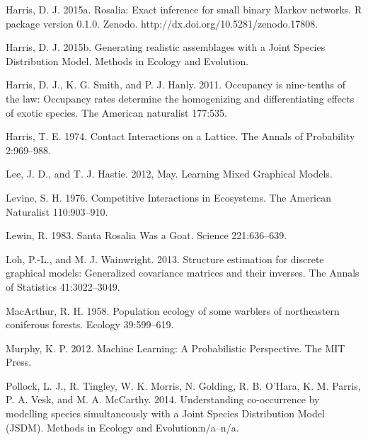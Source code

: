 \documentclass[12pt,]{article}
\begin{document}
\begin{spacing}{1.9}
\begin{flushleft}
Harris, D. J. 2015a. Rosalia: Exact inference for small binary Markov
networks. R package version 0.1.0. Zenodo.
http://dx.doi.org/10.5281/zenodo.17808.

Harris, D. J. 2015b. Generating realistic assemblages with a Joint
Species Distribution Model. Methods in Ecology and Evolution.

Harris, D. J., K. G. Smith, and P. J. Hanly. 2011. Occupancy is
nine-tenths of the law: Occupancy rates determine the homogenizing and
differentiating effects of exotic species. The American naturalist
177:535.

Harris, T. E. 1974. Contact Interactions on a Lattice. The Annals of
Probability 2:969--988.

Lee, J. D., and T. J. Hastie. 2012, May. Learning Mixed Graphical
Models.

Levine, S. H. 1976. Competitive Interactions in Ecosystems. The American
Naturalist 110:903--910.

Lewin, R. 1983. Santa Rosalia Was a Goat. Science 221:636--639.

Loh, P.-L., and M. J. Wainwright. 2013. Structure estimation for
discrete graphical models: Generalized covariance matrices and their
inverses. The Annals of Statistics 41:3022--3049.

MacArthur, R. H. 1958. Population ecology of some warblers of
northeastern coniferous forests. Ecology 39:599--619.

Murphy, K. P. 2012. Machine Learning: A Probabilistic Perspective. The
MIT Press.

Pollock, L. J., R. Tingley, W. K. Morris, N. Golding, R. B. O'Hara, K.
M. Parris, P. A. Vesk, and M. A. McCarthy. 2014. Understanding
co-occurrence by modelling species simultaneously with a Joint Species
Distribution Model (JSDM). Methods in Ecology and Evolution:n/a--n/a.


\end{flushleft}
\end{spacing}
\end{document}
